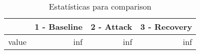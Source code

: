 \begin{table}[htbp]
\caption{Estatísticas para comparison}
\label{tab:comparison_means}
\begin{tabular}{lrrr}
\toprule
 & 1 - Baseline & 2 - Attack & 3 - Recovery \\
\midrule
value & inf & inf & inf \\
\bottomrule
\end{tabular}
\end{table}
